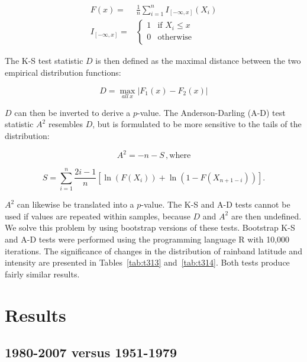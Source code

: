\documentclass{ametsoc}
\begin{document}
\begin{align}
	F(x) =& \frac{1}{n}\sum_{i=1}^n I_{[-\infty,x]} (X_i) \\
	I_{[-\infty,x]} =& 
	\begin{cases}
   		 1 & \text{if } X_i \leq x\\
    		0 & \text{otherwise} \\
    	\end{cases}
\end{align}

 The K-S test statistic $D$ is then defined as the maximal distance between the two empirical distribution functions:

\begin{equation}
	D=\max_{all\ x} |F_{1}(x)-F_{2}(x)|
\end{equation}

$D$ can then be inverted to derive a $p$-value. The Anderson-Darling (A-D) test statistic $A^2$ resembles $D$, but is formulated to be more sensitive to the tails of the distribution:

\begin{equation}
	A^2 = -n-S \,,
	\mathrm{where}
\end{equation}

\begin{equation}
	S=\sum_{i=1}^n \frac{2i-1}{n}\left[\ln(F(X_i)) + \ln\left(1-F(X_{n+1-i})\right)\right].
\end{equation}

$A^2$ can likewise be translated into a $p$-value. The K-S and A-D tests cannot be used if values are repeated within samples, because $D$ and $A^2$ are then undefined. We solve this problem by using bootstrap versions of these tests. Bootstrap K-S and A-D tests were performed using the programming language R with 10,000 iterations. The significance of changes in the distribution of rainband latitude and intensity are presented in Tables~\ref{tab:t313} and~\ref{tab:t314}. Both tests produce fairly similar results.

\section{Results}

\subsection{1980-2007 versus 1951-1979}
\end{document}
